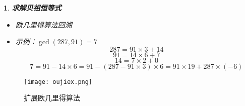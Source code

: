 \documentclass[UTF8]{report}
\theoremstyle{MyLineTheoremStyle} %
\theoremstyle{MyBlockTheoremStyle} %
\theoremstyle{MySubsubsectionStyle} %
\newtheorem{definition}{}
\begin{document}
\begin{definition}
    \textbf{求解贝祖恒等式}
    \begin{itemize}
        \item 欧几里得算法回溯
        \item 示例：$\gcd(287, 91) = 7$
        \[
            287 = 91 \times 3 + 14
            \]
            \[
            91 = 14 \times 6 + 7
            \]
            \[
            14 = 7 \times 2 + 0
            \]
        \[
        7 = 91 - 14 \times 6 = 91 - (287 - 91 \times 3) \times 6 = 91 \times 19 + 287 \times (-6)
        \]
    \end{itemize}
\end{definition}

\begin{figure}[ht]
    \centering
    \texttt{[image: oujiex.png]}
    \caption{扩展欧几里得算法}
\end{figure}
\end{document}
